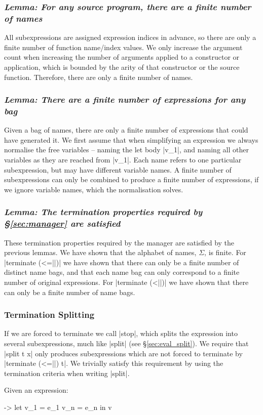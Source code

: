 \documentclass[draft]{sigplanconf}
\newcommand{\lemma}[1]{\subsubsection*{\textit{Lemma: #1}}}
\begin{document}
\lemma{For any source program, there are a finite number of names}

All subexpressions are assigned expression indices in advance, so there are only a finite number of function name/index values. We only increase the argument count when increasing the number of arguments applied to a constructor or application, which is bounded by the arity of that constructor or the source function. Therefore, there are only a finite number of names.

\lemma{There are a finite number of expressions for any bag}

Given a bag of names, there are only a finite number of expressions that could have generated it. We first assume that when simplifying an expression we always normalise the free variables -- naming the let body |v_1|, and naming all other variables as they are reached from |v_1|. Each name refers to one particular subexpression, but may have different variable names. A finite number of subexpressions can only be combined to produce a finite number of expressions, if we ignore variable names, which the normalisation solves.

\lemma{The termination properties required by \S\ref{sec:manager} are satisfied}

These termination properties required by the manager are satisfied by the previous lemmas. We have shown that the alphabet of names, $\Sigma$, is finite. For |terminate (<=||)| we have shown that there can only be a finite number of distinct name bags, and that each name bag can only correspond to a finite number of original expressions. For |terminate (<||)| we have shown that there can only be a finite number of name bags.

\subsubsection{Termination Splitting}
\label{sec:term_split}

If we are forced to terminate we call |stop|, which splits the expression into several subexpressions, much like |split| (see \S\ref{sec:eval_split}). We require that |split t x| only produces subexpressions which are not forced to terminate by |terminate (<=||) t|. We trivially satisfy this requirement by using the termination criteria when writing |split|.

Given an expression:

\begin{code}
\free ->  let  v_1 = e_1
               v_n = e_n
          in   v
\end{code}
\end{document}
